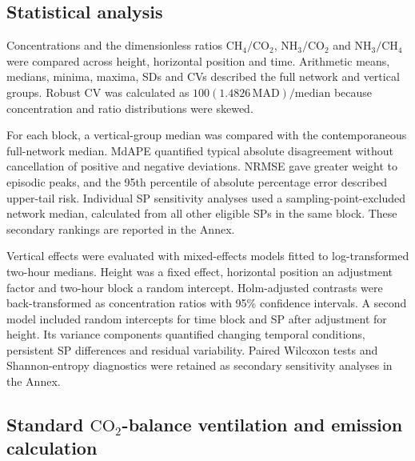 \documentclass[12pt,a4paper]{article}
\begin{document}
\subsection{Statistical analysis}

Concentrations and the dimensionless ratios \(\mathrm{CH_4}/\mathrm{CO_2}\), \(\mathrm{NH_3}/\mathrm{CO_2}\) and \(\mathrm{NH_3}/\mathrm{CH_4}\) were compared across height, horizontal position and time. Arithmetic means, medians, minima, maxima, SDs and CVs described the full network and vertical groups. Robust CV was calculated as \(100(1.4826\,\mathrm{MAD})/\mathrm{median}\) because concentration and ratio distributions were skewed.

For each block, a vertical-group median was compared with the contemporaneous full-network median. MdAPE quantified typical absolute disagreement without cancellation of positive and negative deviations. NRMSE gave greater weight to episodic peaks, and the 95th percentile of absolute percentage error described upper-tail risk. Individual SP sensitivity analyses used a sampling-point-excluded network median, calculated from all other eligible SPs in the same block. These secondary rankings are reported in the Annex.

Vertical effects were evaluated with mixed-effects models fitted to log-transformed two-hour medians. Height was a fixed effect, horizontal position an adjustment factor and two-hour block a random intercept. Holm-adjusted contrasts were back-transformed as concentration ratios with 95\% confidence intervals. A second model included random intercepts for time block and SP after adjustment for height. Its variance components quantified changing temporal conditions, persistent SP differences and residual variability. Paired Wilcoxon tests and Shannon-entropy diagnostics were retained as secondary sensitivity analyses in the Annex.

\subsection{Standard \texorpdfstring{\(\mathrm{CO_2}\)}{CO2}-balance ventilation and emission calculation}
\end{document}
